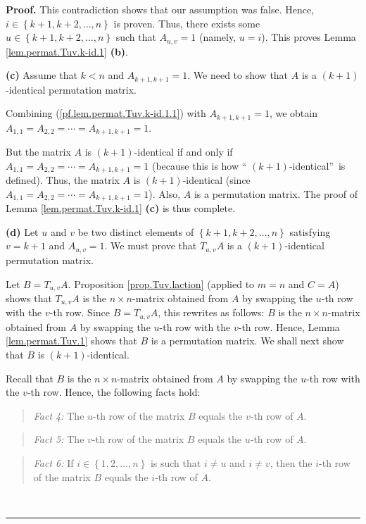 \documentclass[numbers=enddot,12pt,final,onecolumn,notitlepage]{scrartcl}%
\theoremstyle{definition}
\newenvironment{statement}{\begin{quote}}{\end{quote}}
\newenvironment{proof}[1][Proof]{\noindent\textbf{#1.} }{\ \rule{0.5em}{0.5em}}
\begin{document}
\begin{proof}
This contradiction shows that our assumption was false. Hence, $i\in\left\{
k+1,k+2,\ldots,n\right\}  $ is proven. Thus, there exists some $u\in\left\{
k+1,k+2,\ldots,n\right\}  $ such that $A_{u,v}=1$ (namely, $u=i$). This proves
Lemma \ref{lem.permat.Tuv.k-id.1} \textbf{(b)}.

\textbf{(c)} Assume that $k<n$ and $A_{k+1,k+1}=1$. We need to show that $A$
is a $\left(  k+1\right)  $-identical permutation matrix.

Combining (\ref{pf.lem.permat.Tuv.k-id.1.1}) with $A_{k+1,k+1}=1$, we obtain
$A_{1,1}=A_{2,2}=\cdots=A_{k+1,k+1}=1$.

But the matrix $A$ is $\left(  k+1\right)  $-identical if and only if
$A_{1,1}=A_{2,2}=\cdots=A_{k+1,k+1}=1$ (because this is how \textquotedblleft%
$\left(  k+1\right)  $-identical\textquotedblright\ is defined). Thus, the
matrix $A$ is $\left(  k+1\right)  $-identical (since $A_{1,1}=A_{2,2}%
=\cdots=A_{k+1,k+1}=1$). Also, $A$ is a permutation matrix. The proof of Lemma
\ref{lem.permat.Tuv.k-id.1} \textbf{(c)} is thus complete.

\textbf{(d)} Let $u$ and $v$ be two distinct elements of $\left\{
k+1,k+2,\ldots,n\right\}  $ satisfying $v=k+1$ and $A_{u,v}=1$. We must prove
that $T_{u,v}A$ is a $\left(  k+1\right)  $-identical permutation matrix.

Let $B=T_{u,v}A$. Proposition \ref{prop.Tuv.laction} (applied to $m=n$ and
$C=A$) shows that $T_{u,v}A$ is the $n\times n$-matrix obtained from $A$ by
swapping the $u$-th row with the $v$-th row. Since $B=T_{u,v}A$, this rewrites
as follows: $B$ is the $n\times n$-matrix obtained from $A$ by swapping the
$u$-th row with the $v$-th row. Hence, Lemma \ref{lem.permat.Tuv.1} shows that
$B$ is a permutation matrix. We shall next show that $B$ is $\left(
k+1\right)  $-identical.

Recall that $B$ is the $n\times n$-matrix obtained from $A$ by swapping the
$u$-th row with the $v$-th row. Hence, the following facts hold:

\begin{statement}
\textit{Fact 4:} The $u$-th row of the matrix $B$ equals the $v$-th row of $A$.
\end{statement}

\begin{statement}
\textit{Fact 5:} The $v$-th row of the matrix $B$ equals the $u$-th row of $A$.
\end{statement}

\begin{statement}
\textit{Fact 6:} If $i\in\left\{  1,2,\ldots,n\right\}  $ is such that $i\neq
u$ and $i\neq v$, then the $i$-th row of the matrix $B$ equals the $i$-th row
of $A$.
\end{statement}


\end{proof}
\end{document}
